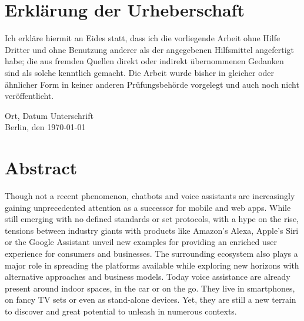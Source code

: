 \chapter*{Erkl{\"a}rung der Urheberschaft}
Ich erkläre hiermit an Eides statt, dass ich die vorliegende Arbeit ohne Hilfe Dritter und ohne Benutzung anderer als der angegebenen Hilfsmittel angefertigt habe; die aus fremden Quellen direkt oder indirekt übernommenen Gedanken sind als solche kenntlich gemacht. Die Arbeit wurde bisher in gleicher oder ähnlicher Form in keiner anderen Prüfungsbehörde vorgelegt und auch noch nicht veröffentlicht.


\vspace{4cm}

Ort, Datum \hfill Unterschrift\\
Berlin, den \today


\newpage
\chapter*{Abstract}

Though not a recent phenomenon, chatbots and voice assistants are increasingly gaining unprecedented attention as a successor for mobile and web apps. While still emerging with no defined standards or set protocols, with a hype on the rise, tensions between industry giants with products like Amazon's Alexa, Apple's Siri or the Google Assistant %
unveil new examples for providing an enriched user experience for consumers and businesses. The surrounding ecosystem also plays a major role in spreading the platforms available while exploring new horizons with alternative approaches and business models. Today voice assistance are already present around indoor spaces, in the car or on the go. They live in smartphones, on fancy TV sets or even as stand-alone devices. Yet, they are still a new terrain to discover and great potential to unleash in numerous contexts.\\ 

